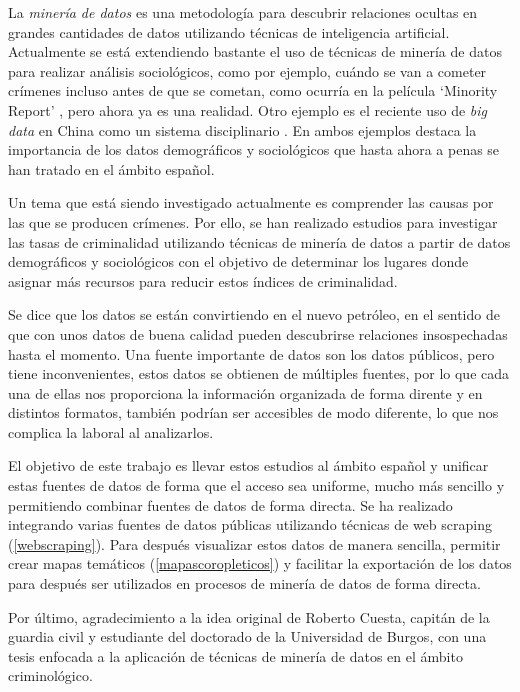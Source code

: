 
La \textit{minería de datos} es una metodología para descubrir relaciones ocultas en grandes cantidades de datos utilizando técnicas de inteligencia artificial. Actualmente se está extendiendo bastante el uso de técnicas de minería de datos para realizar análisis sociológicos, como por ejemplo, cuándo se van a cometer crímenes incluso antes de que se cometan, como ocurría en la película `Minority Report' \cite{movie:minorityreport}, pero ahora ya es una realidad. Otro ejemplo es el reciente uso de \textit{big data} en China como un sistema disciplinario \cite{art:chinabigdata}. En ambos ejemplos destaca la importancia de los datos demográficos y sociológicos que hasta ahora a penas se han tratado en el ámbito español.

Un tema que está siendo investigado actualmente es comprender las causas por las que se producen crímenes. Por ello, se han realizado estudios para investigar las tasas de criminalidad utilizando técnicas de minería de datos \cite{art:crimeprediction} \cite{art:crimeprediction2} a partir de datos demográficos y sociológicos con el objetivo de determinar los lugares donde asignar más recursos para reducir estos índices de criminalidad.

Se dice que los datos se están convirtiendo en el nuevo petróleo, en el sentido de que con unos datos de buena calidad pueden descubrirse relaciones insospechadas hasta el momento. Una fuente importante de datos son los datos públicos, pero tiene inconvenientes, estos datos se obtienen de múltiples fuentes, por lo que cada una de ellas nos proporciona la información organizada de forma dirente y en distintos formatos, también podrían ser accesibles de modo diferente, lo que nos complica la laboral al analizarlos.

El objetivo de este trabajo es llevar estos estudios al ámbito español y unificar estas fuentes de datos de forma que el acceso sea uniforme, mucho más sencillo y permitiendo combinar fuentes de datos de forma directa. Se ha realizado integrando varias fuentes de datos públicas utilizando técnicas de web scraping (\ref{webscraping}). Para  después visualizar estos datos de manera sencilla, permitir crear mapas temáticos (\ref{mapascoropleticos}) y facilitar la exportación de los datos para después ser utilizados en procesos de minería de datos de forma directa.

Por último, agradecimiento a la idea original de Roberto Cuesta, capitán de la guardia civil y estudiante del doctorado de la Universidad de Burgos, con una tesis enfocada a la aplicación de técnicas de minería de datos en el ámbito criminológico.

